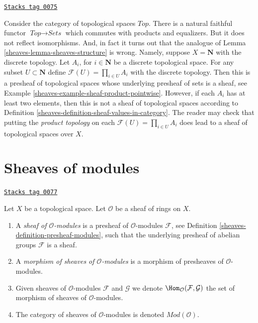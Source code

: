 \begin{example}
\label{sheaves-example-sheaves-topological-spaces}
\href{https://stacks.math.columbia.edu/tag/0075}{\texttt{Stacks tag 0075}}

Consider the category of topological spaces $\textit{Top}$.
There is a natural faithful functor $\textit{Top} \to \textit{Sets}$
which commutes with products and equalizers. But it does
not reflect isomorphisms. And, in fact it turns out that
the analogue of Lemma \ref{sheaves-lemma-sheaves-structure} is wrong.
Namely, suppose $X = \mathbf{N}$ with the discrete
topology. Let $A_i$, for $i \in \mathbf{N}$ be a discrete
topological space. For any subset $U \subset \mathbf{N}$
define $\mathcal{F}(U) = \prod_{i\in U} A_i$ with the
discrete topology. Then this is a presheaf of topological
spaces whose underlying presheaf of sets is a sheaf, see
Example \ref{sheaves-example-sheaf-product-pointwise}.
However, if each $A_i$ has at least two elements, then
this is not a sheaf of topological spaces
according to Definition \ref{sheaves-definition-sheaf-values-in-category}.
The reader may check that putting the {\it product topology} on
each $\mathcal{F}(U) = \prod_{i\in U} A_i$ does lead to a sheaf
of topological spaces over $X$.
\end{example}

\section{Sheaves of modules}
\label{sheaves-section-sheaves-modules}
\begin{definition}
\label{sheaves-definition-sheaf-modules}
\href{https://stacks.math.columbia.edu/tag/0077}{\texttt{Stacks tag 0077}}

Let $X$ be a topological space.
Let $\mathcal{O}$ be a sheaf of rings on $X$.
\begin{enumerate}
\item A {\it sheaf of $\mathcal{O}$-modules} is a presheaf
of $\mathcal{O}$-modules $\mathcal{F}$,
see Definition \ref{sheaves-definition-presheaf-modules},
such that the underlying presheaf of abelian groups $\mathcal{F}$
is a sheaf.
\item A {\it morphism of sheaves of $\mathcal{O}$-modules}
is a morphism of presheaves of $\mathcal{O}$-modules.
\item Given sheaves of $\mathcal{O}$-modules
$\mathcal{F}$ and $\mathcal{G}$ we denote
$\Hom_\mathcal{O}(\mathcal{F}, \mathcal{G})$
the set of morphism of sheaves of $\mathcal{O}$-modules.
\item The category of sheaves of $\mathcal{O}$-modules
is denoted $\textit{Mod}(\mathcal{O})$.
\end{enumerate}
\end{definition}

